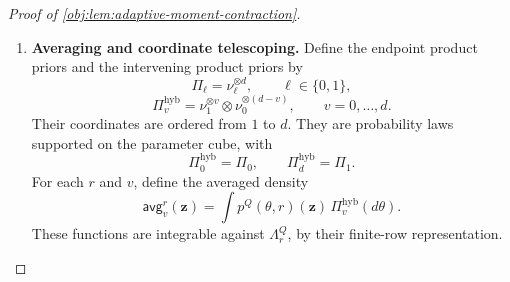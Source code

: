 \begin{proof}[Proof of \cref{obj:lem:adaptive-moment-contraction}]
\begin{enumerate}
Define its Taylor polynomial by
\[
\mathsf{taylor}^{\theta,r}_{j,k}(u)
=
\sum_{q=0}^{k-1}
 \frac{\left(\mathsf{poly}^{\theta,r}_j\right)^{(q)}(0)}{q!}\,u^q,
\qquad u\in\mathbb R.
\]
At \(u=0\), the remainder equals zero. For \(u\ne0\), Taylor's theorem with Lagrange remainder on the segment joining \(0\) and \(u\) gives
\[
\begin{split}
\left|
 \mathsf{poly}^{\theta,r}_j(u)
 -\mathsf{taylor}^{\theta,r}_{j,k}(u)
\right|
&\le
\frac{|u|^k}{k!}
\sup_{u_*\in[\min\{0,u\},\,\max\{0,u\}]}
 \left|
 \left(\mathsf{poly}^{\theta,r}_j\right)^{(k)}(u_*)
 \right|\\
&\le |u|^k\sqrt{\binom nk}\,\beta^k
\qquad(|u|\le\alpha).
\end{split}
\]
Matching moments cancel its Taylor polynomial:
\[
\int\mathsf{taylor}^{\theta,r}_{j,k}(u)\,\nu_0(du)
=
\int\mathsf{taylor}^{\theta,r}_{j,k}(u)\,\nu_1(du).
\]
Each prior is supported on \([-\alpha,\alpha]\) and has mass one, so
\[
\left|
\int
 \left(\mathsf{poly}^{\theta,r}_j(u)
       -\mathsf{taylor}^{\theta,r}_{j,k}(u)\right)\nu_\ell(du)
\right|
\le\alpha^k\sqrt{\binom nk}\,\beta^k,
\qquad \ell\in\{0,1\}.
\]
Finally, exchanging the integrals in the scalar polynomial gives
\[
\begin{split}
\int|\mathsf{diff}^{\theta,r}_j(\mathbf z)|\,\Lambda_r^Q(d\mathbf z)
&=
\int\mathsf{poly}^{\theta,r}_j(u)\,\nu_0(du)
-\int\mathsf{poly}^{\theta,r}_j(u)\,\nu_1(du)\\
&\le 2\alpha^k\sqrt{\binom nk}\,\beta^k.
\end{split}
\]
This is uniform in the remaining coordinates, the seed, and the coordinate being replaced.

\item \textbf{Averaging and coordinate telescoping.}
Define the endpoint product priors and the intervening product priors by
\[
\Pi_\ell=\nu_\ell^{\otimes d},
\qquad \ell\in\{0,1\},
\]
\[
\Pi_v^{\mathrm{hyb}}
=\nu_1^{\otimes v}\otimes\nu_0^{\otimes(d-v)},
\qquad v=0,\ldots,d.
\]
Their coordinates are ordered from \(1\) to \(d\). They are probability laws supported on the parameter cube, with
\[
\Pi_0^{\mathrm{hyb}}=\Pi_0,
\qquad
\Pi_d^{\mathrm{hyb}}=\Pi_1.
\]
For each \(r\) and \(v\), define the averaged density
\[
\mathsf{avg}_v^r(\mathbf z)
=\int p^Q(\theta,r)(\mathbf z)\,\Pi_v^{\mathrm{hyb}}(d\theta).
\]
These functions are integrable against \(\Lambda_r^Q\), by their finite-row representation.


\end{enumerate}
\end{proof}
